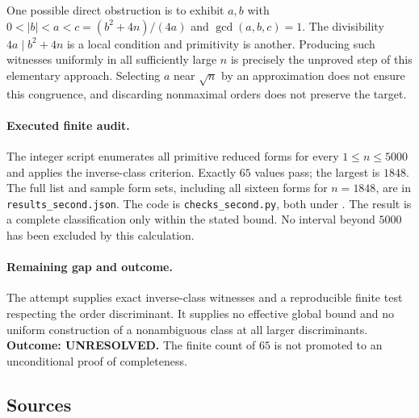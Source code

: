 \documentclass[11pt,a4paper]{article}
\begin{document}
One possible direct obstruction is to exhibit $a,b$ with
$0<|b|<a<c=(b^2+4n)/(4a)$ and $\gcd(a,b,c)=1$. The divisibility
$4a\mid b^2+4n$ is a local condition and primitivity is another.
Producing such witnesses uniformly in all sufficiently large $n$ is
precisely the unproved step of this elementary approach. Selecting $a$
near $\sqrt n$ by an approximation does not ensure this congruence,
and discarding nonmaximal orders does not preserve the target.

\paragraph{Executed finite audit.}
The integer script enumerates all primitive reduced forms for every
$1\le n\le5000$ and applies the inverse-class criterion. Exactly
$65$ values pass; the largest is $1848$. The full list and sample form
sets, including all sixteen forms for $n=1848$, are in
\texttt{results\_second.json}. The code is
\texttt{checks\_second.py}, both under
.
The result is a complete classification only within the stated bound.
No interval beyond $5000$ has been excluded by this calculation.

\paragraph{Remaining gap and outcome.}
The attempt supplies exact inverse-class witnesses and a reproducible
finite test respecting the order discriminant. It supplies no effective
global bound and no uniform construction of a nonambiguous class at all
larger discriminants. \textbf{Outcome: UNRESOLVED.} The finite count of
$65$ is not promoted to an unconditional proof of completeness.

\subsection{Sources}
\end{document}
